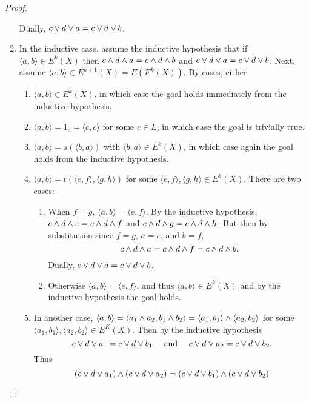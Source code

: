 \begin{proof}
\begin{enumerate}
    Dually, $c \vee d \vee a = c \vee d \vee b$.
  \item
    In the inductive case, assume the inductive hypothesis that if $\langle a, b \rangle \in E^k(X)$ then $c\wedge d\wedge a = c \wedge d \wedge b$ and $c\vee d\vee a = c\vee d\vee b$.
    Next, assume $\langle a, b\rangle \in E^{k+1}(X) = E(E^k(X))$.
    By cases, either
    \begin{enumerate}
      \item
        $\langle a, b\rangle \in E^k(X)$, in which case the goal holds immediately from the inductive hypothesis.
      \item
        $\langle a, b\rangle = 1_c = \langle c, c \rangle$ for some $c \in L$, in which case the goal is trivially true.
      \item
        $\langle a, b\rangle = s(\langle b, a\rangle)$ with $\langle b, a\rangle \in E^k(X)$, in which case again the goal holds from the inductive hypothesis.
      \item
        $\langle a, b\rangle = t(\langle e ,f \rangle, \langle g, h\rangle)$ for some $\langle e ,f \rangle, \langle g, h\rangle \in E^k(X)$. 
        There are two cases:
        \begin{enumerate}
          \item
            When $f = g$, $\langle a, b\rangle = \langle e, f\rangle$.
            By the inductive hypothesis, $c\wedge d\wedge e = c\wedge d\wedge f$ and $c \wedge d \wedge g = c \wedge d \wedge h$.
            But then by substitution since $f = g$, $a = e$, and $b = f$,
            \[
              c \wedge d \wedge a = c \wedge d \wedge f = c \wedge d \wedge b.
            \]
            Dually, $c\vee d \vee a = c\vee d \vee b$.
          \item
            Otherwise $\langle a, b\rangle = \langle e, f \rangle$, and thus $\langle a, b \rangle \in E^k(X)$ and by the inductive hypothesis the goal holds.
        \end{enumerate}
      \item
        In another case, $\langle a, b \rangle = \langle a_1 \wedge a_2, b_1 \wedge b_2 \rangle = \langle a_1, b_1 \rangle \wedge \langle a_2, b_2\rangle$ for some $\langle a_1, b_1\rangle, \langle a_2, b_2\rangle \in E^K(X)$.
        Then by the inductive hypothesis
        \[
          c \vee d \vee a_1 = c \vee d \vee b_1 \quad\text{ and }\quad c \vee d \vee a_2 = c\vee d \vee b_2.
        \]
        Thus
        \[
         (c \vee d \vee a_1) \wedge (c \vee d \vee a_2)  = (c \vee d \vee b_1) \wedge (c\vee d \vee b_2)
\]
\end{enumerate}
\end{enumerate}
\end{proof}
